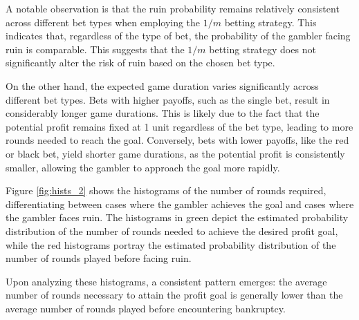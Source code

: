\documentclass[11pt,twoside]{article}
\numberwithin{Theorem}{section}
\numberwithin{Definition}{section}
\numberwithin{Lemma}{section}
\numberwithin{Algorithm}{section}
\numberwithin{equation}{section}
\begin{document}
A notable observation is that the ruin probability remains relatively consistent across different bet types when employing the $1/m$ betting strategy. This indicates that, regardless of the type of bet, the probability of the gambler facing ruin is comparable. This suggests that the $1/m$ betting strategy does not significantly alter the risk of ruin based on the chosen bet type.

On the other hand, the expected game duration varies significantly across different bet types. Bets with higher payoffs, such as the single bet, result in considerably longer game durations. This is likely due to the fact that the potential profit remains fixed at 1 unit regardless of the bet type, leading to more rounds needed to reach the goal. Conversely, bets with lower payoffs, like the red or black bet, yield shorter game durations, as the potential profit is consistently smaller, allowing the gambler to approach the goal more rapidly.

Figure \ref{fig:hists_2} shows the histograms of the number of rounds required, differentiating between cases where the gambler achieves the goal and cases where the gambler faces ruin. The histograms in green depict the estimated probability distribution of the number of rounds needed to achieve the desired profit goal, while the red histograms portray the estimated probability distribution of the number of rounds played before facing ruin.

Upon analyzing these histograms, a consistent pattern emerges: the average number of rounds necessary to attain the profit goal is generally lower than the average number of rounds played before encountering bankruptcy. 

\clearpage
\end{document}
